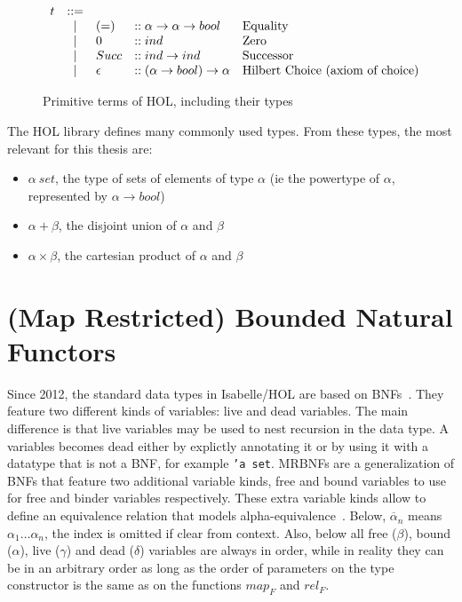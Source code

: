 \begin{figure} %
\[
\begin{array}{rclll}
t  & \mathop{{:}{:}{=}} & & & \\
& \mathop{|} & (=) & :: \alpha \to \alpha \to bool & \text{Equality} \\
& \mathop{|} & 0 & :: ind & \text{Zero} \\
& \mathop{|} & Succ & :: ind \to ind & \text{Successor} \\
& \mathop{|} & \epsilon & :: (\alpha \to bool) \to \alpha & \text{Hilbert Choice (axiom of choice)} \\
\end{array}
\]
\caption{Primitive terms of \ac{HOL}, including their types}
\label{fig:hol_terms}
\end{figure}

The \ac{HOL} library defines many commonly used types. From these types, the most relevant for this thesis are:

\begin{itemize}
\item{$\alpha \: set$, the type of sets of elements of type $\alpha$ (ie the powertype of $\alpha$, represented by $\alpha \to bool$)}
\item{$\alpha + \beta$, the disjoint union of $\alpha$ and $\beta$}
\item{$\alpha \times \beta$, the cartesian product of $\alpha$ and $\beta$}
\end{itemize}

\section{(Map Restricted) Bounded Natural Functors}\label{sec:mrbnf_theory}

Since 2012, the standard data types in Isabelle/HOL are based on \acfp{BNF}~\cite{isabelle_datatypes}. They feature two different kinds of variables: live and dead variables. The main difference is that live variables may be used to nest recursion in the data type. A variables becomes dead either by explictly annotating it or by using it with a datatype that is not a \ac{BNF}, for example \texttt{'a set}. \acp{MRBNF} are a generalization of \acp{BNF} that feature two additional variable kinds, free and bound variables to use for free and binder variables respectively. These extra variable kinds allow to define an equivalence relation that models alpha-equivalence~\cite{mrbnfs}. Below, $\overline{\alpha}_n$ means $\alpha_1 \dots \alpha_n$, the index is omitted if clear from context. Also, below all free ($\beta$), bound ($\alpha$), live ($\gamma$) and dead ($\delta$) variables are always in order, while in reality they can be in an arbitrary order as long as the order of parameters on the type constructor is the same as on the functions $map_F$ and $rel_F$.

